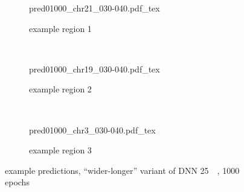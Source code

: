 \begin{figure}[p]
    \begin{subfigure}{\textwidth}
        \centering
        \scriptsize
        {pred01000_chr21_030-040.pdf_tex}
        \caption{example  region 1} \label{fig:results:wider-longer_r1}
    \end{subfigure}\\[6mm]
    \begin{subfigure}{\textwidth}
        \centering
        \scriptsize
        {pred01000_chr19_030-040.pdf_tex}
        \caption{example region 2} \label{fig:results:wider-longer_r2}
    \end{subfigure}\\[6mm]
    \begin{subfigure}{\textwidth}
        \centering
        \scriptsize
        {pred01000_chr3_030-040.pdf_tex}
        \caption{example region 3} \label{fig:results:wider-longer_r3}
    \end{subfigure}
    \caption{example predictions, ``wider-longer'' variant of DNN \SI{25}{\kilo\bp}, 1000 epochs} \label{fig:results:wider-longer_matrices}
\end{figure}

